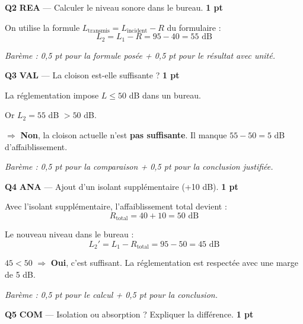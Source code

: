 \documentclass[a4paper,11pt]{article}
\newcommand{\pts}[1]{\hfill\textcolor{gris}{\small\textbf{#1}}}
\newcommand{\comp}[1]{\colorbox{blue!10}{\scriptsize\textbf{#1}}}
\begin{document}
\textbf{Q2} \comp{REA} — Calculer le niveau sonore dans le bureau. \pts{1 pt}

\begin{corrbox}
On utilise la formule $L_{\text{transmis}} = L_{\text{incident}} - R$ du formulaire :
\[
L_2 = L_1 - R = 95 - 40 = \boxed{55 \text{ dB}}
\]

\textit{Barème : 0,5 pt pour la formule posée + 0,5 pt pour le résultat avec unité.}
\end{corrbox}

\textbf{Q3} \comp{VAL} — La cloison est-elle suffisante ? \pts{1 pt}

\begin{corrbox}
La réglementation impose $L \leq 50$ dB dans un bureau.

Or $L_2 = 55$ dB $> 50$ dB.

$\Rightarrow$ \textbf{Non}, la cloison actuelle n'est \textbf{pas suffisante}. Il manque $55 - 50 = 5$ dB d'affaiblissement.

\smallskip
\textit{Barème : 0,5 pt pour la comparaison + 0,5 pt pour la conclusion justifiée.}
\end{corrbox}

\textbf{Q4} \comp{ANA} — Ajout d'un isolant supplémentaire (+10 dB). \pts{1 pt}

\begin{corrbox}
Avec l'isolant supplémentaire, l'affaiblissement total devient :
\[
R_{\text{total}} = 40 + 10 = 50 \text{ dB}
\]

Le nouveau niveau dans le bureau :
\[
L_2' = L_1 - R_{\text{total}} = 95 - 50 = \boxed{45 \text{ dB}}
\]

$45 < 50$ $\Rightarrow$ \textbf{Oui}, c'est suffisant. La réglementation est respectée avec une marge de 5 dB.

\smallskip
\textit{Barème : 0,5 pt pour le calcul + 0,5 pt pour la conclusion.}
\end{corrbox}

\textbf{Q5} \comp{COM} — Isolation ou absorption ? Expliquer la différence. \pts{1 pt}
\end{document}
